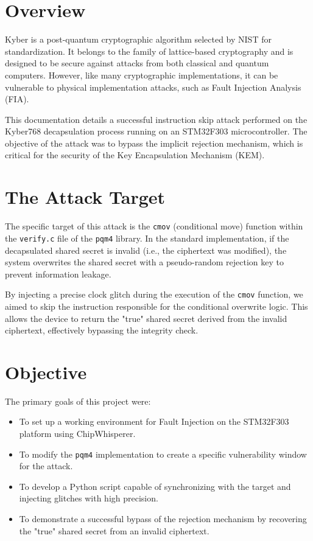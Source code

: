 \section{Overview}
Kyber is a post-quantum cryptographic algorithm selected by NIST for standardization. It belongs to the family of lattice-based cryptography and is designed to be secure against attacks from both classical and quantum computers. However, like many cryptographic implementations, it can be vulnerable to physical implementation attacks, such as Fault Injection Analysis (FIA).

This documentation details a successful instruction skip attack performed on the Kyber768 decapsulation process running on an STM32F303 microcontroller. The objective of the attack was to bypass the implicit rejection mechanism, which is critical for the security of the Key Encapsulation Mechanism (KEM).

\section{The Attack Target}
The specific target of this attack is the \texttt{cmov} (conditional move) function within the \texttt{verify.c} file of the \texttt{pqm4} library. In the standard implementation, if the decapsulated shared secret is invalid (i.e., the ciphertext was modified), the system overwrites the shared secret with a pseudo-random rejection key to prevent information leakage.

By injecting a precise clock glitch during the execution of the \texttt{cmov} function, we aimed to skip the instruction responsible for the conditional overwrite logic. This allows the device to return the "true" shared secret derived from the invalid ciphertext, effectively bypassing the integrity check.

\section{Objective}
The primary goals of this project were:
\begin{itemize}
    \item To set up a working environment for Fault Injection on the STM32F303 platform using ChipWhisperer.
    \item To modify the \texttt{pqm4} implementation to create a specific vulnerability window for the attack.
    \item To develop a Python script capable of synchronizing with the target and injecting glitches with high precision.
    \item To demonstrate a successful bypass of the rejection mechanism by recovering the "true" shared secret from an invalid ciphertext.
\end{itemize}
